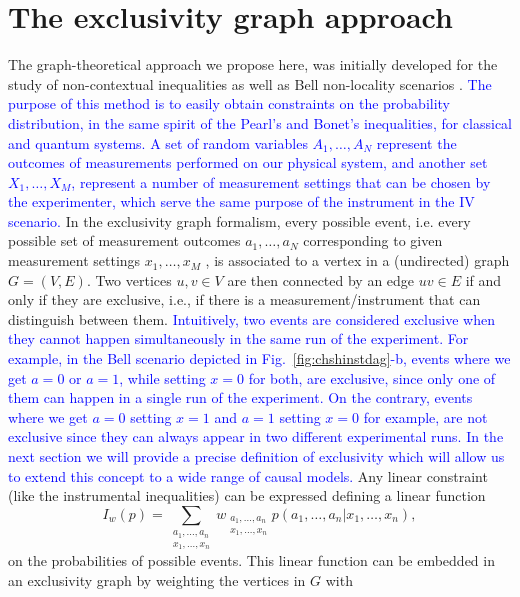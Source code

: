 \documentclass[letterpaper]{article}
\begin{document}
\section{The exclusivity graph approach}
The graph-theoretical approach we propose here, was initially developed for the
study of non-contextual inequalities \cite{cabello2014} as well as Bell
non-locality scenarios \cite{acin2015}. 
\textcolor{blue}{
The purpose of this method is to easily obtain constraints on the probability distribution, in the same spirit of the Pearl's and Bonet's inequalities, for classical and quantum systems. A set of random variables $A_1,\ldots,A_N$ represent the outcomes of measurements performed on our physical system,
and another set $X_1,\ldots,X_M$, represent a number of measurement settings that can be chosen by the experimenter, which serve the same purpose of the instrument in the IV scenario.} In the exclusivity graph formalism, every possible event, i.e. every possible set of measurement
outcomes $a_1,\ldots, a_N$ corresponding to given measurement settings
$x_1,\ldots,x_M$ , is
associated to a vertex in a (undirected) graph $G = (V, E)$. 
Two vertices $u, v \in V$ are then connected by an edge $uv \in E$ if and only if they are
exclusive, i.e., if there is a measurement/instrument that can distinguish between
them. 
\textcolor{blue}{
Intuitively, two events are considered exclusive when they cannot happen simultaneously in the same run of the experiment.
For example, in the Bell scenario depicted in Fig.~\ref{fig:chshinstdag}-b, events where we get $a = 0$ or $a = 1$, while
setting $x = 0$ for both, are exclusive, since only one of them can happen in a single run of the experiment.
On the contrary, events where we get $a = 0$ setting $x = 1$ and $a=1$ setting $x=0$ for example, are not exclusive since they can always appear in two different experimental runs. In the next section we will provide a precise definition of exclusivity which will allow us to extend this concept to a wide range of causal models.}
Any linear constraint (like the instrumental inequalities) can be
expressed defining a linear function
\begin{equation}
    I_w(p) = \sum_{\substack{a_1,\ldots,a_n\\x_1,\ldots,x_n}}
w_{\substack{a_1,\ldots,a_n\\x_1,\ldots,x_n}} p(a_1,\ldots,a_n|x_1,\ldots,x_n),
\end{equation}
on the probabilities of possible events. This linear function can be
embedded in an exclusivity graph by weighting the vertices in $G$ with
\end{document}
